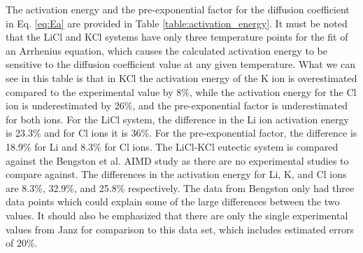 \documentclass[review]{elsarticle}
\begin{document}
The activation energy and the pre-exponential factor for the diffusion coefficient in Eq. \ref{eq:Ea} are provided in Table \ref{table:activation_energy}. It must be noted that the LiCl and KCl systems have only three temperature points for the fit of an Arrhenius equation, which causes the calculated activation energy to be sensitive to the diffusion coefficient value at any given temperature. What we can see in this table is that in KCl the activation energy of the K ion is overestimated compared to the experimental value \cite{janz_Diffusion} by 8\%, while the activation energy for the Cl ion is underestimated by 26\%, and the pre-exponential factor is underestimated for both ions. For the LiCl system, the difference in the Li ion activation energy is 23.3\% and for Cl ions it is 36\%. For the pre-exponential factor, the difference is 18.9\% for Li and 8.3\% for Cl ions. The LiCl-KCl eutectic system is compared against the Bengston et al. \cite{Bengston2014} AIMD study as there are no experimental studies to compare against. The differences in the activation energy for Li, K, and Cl ions are 8.3\%, 32.9\%, and 25.8\% respectively. The data from Bengston only had three data points which could explain some of the large differences between the two values. It should also be emphasized that there are only the single experimental values from Janz for comparison to this data set, which includes estimated errors of 20\%. 
\end{document}
